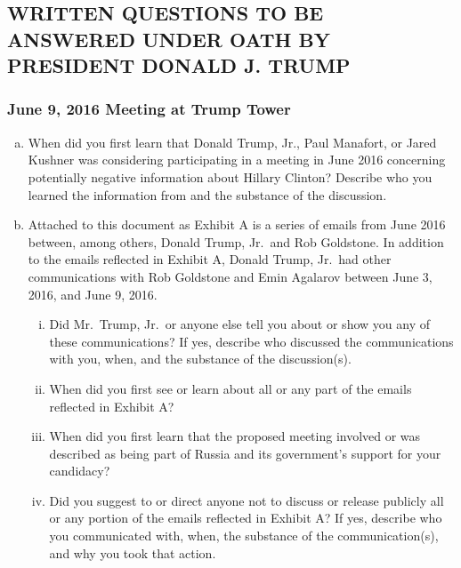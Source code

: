 \hr

\newpage

\subsection{WRITTEN QUESTIONS TO BE ANSWERED UNDER OATH BY PRESIDENT DONALD J. TRUMP}

\subsubsection{June 9, 2016 Meeting at Trump Tower}

\begin{enumerate}[a.]

\item When did you first learn that Donald Trump, Jr., Paul Manafort, or Jared Kushner was considering participating in a meeting in June 2016 concerning potentially negative information about Hillary Clinton?
Describe who you learned the information from and the substance of the discussion.

\item Attached to this document as Exhibit A is a series of emails from June 2016 between, among others, Donald Trump, Jr.\ and Rob Goldstone.
In addition to the emails reflected in Exhibit A, Donald Trump, Jr.\ had other communications with Rob Goldstone and Emin Agalarov between June 3, 2016, and June 9, 2016.

\begin{enumerate}[i.]

\item Did Mr.~Trump, Jr.\ or anyone else tell you about or show you any of these communications?
If yes, describe who discussed the communications with you, when, and the substance of the discussion(s).

\item When did you first see or learn about all or any part of the emails reflected in Exhibit A?

\item When did you first learn that the proposed meeting involved or was described as being part of Russia and its government’s support for your candidacy?

\item Did you suggest to or direct anyone not to discuss or release publicly all or any portion of the emails reflected in Exhibit A? If yes, describe who you communicated with, when, the substance of the communication(s), and why you took that action.


\end{enumerate}
\end{enumerate}
